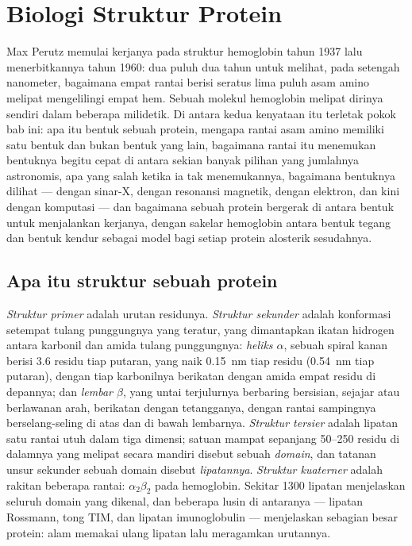 \chapter{Biologi Struktur Protein}\label{ch:b3:structural-biology}

Max Perutz memulai kerjanya pada struktur hemoglobin tahun 1937 lalu
menerbitkannya tahun 1960: dua puluh dua tahun untuk melihat, pada 
setengah nanometer, bagaimana empat rantai berisi seratus lima puluh asam
amino melipat mengelilingi empat hem. Sebuah molekul hemoglobin melipat
dirinya sendiri dalam beberapa milidetik. Di antara kedua kenyataan itu
terletak pokok bab ini: apa itu bentuk sebuah protein, mengapa rantai asam
amino memiliki satu bentuk dan bukan bentuk yang lain, bagaimana rantai itu
menemukan bentuknya begitu cepat di antara sekian banyak pilihan yang
jumlahnya astronomis, apa yang salah ketika ia tak menemukannya, bagaimana
bentuknya dilihat --- dengan sinar-X, dengan resonansi magnetik, dengan
elektron, dan kini dengan komputasi --- dan bagaimana sebuah protein bergerak di antara
bentuk untuk menjalankan kerjanya, dengan sakelar hemoglobin antara bentuk
tegang dan bentuk kendur sebagai model bagi setiap protein alosterik sesudahnya.

\section{Apa itu struktur sebuah protein}

\begin{definition}\label{def:b3:structural-biology:levels}
%
\emph{Struktur primer} adalah urutan residunya. \emph{Struktur sekunder}
adalah konformasi setempat tulang punggungnya yang teratur, yang dimantapkan
ikatan hidrogen antara karbonil dan amida tulang punggungnya: \emph{heliks
$\alpha$}, sebuah spiral kanan berisi $3.6$ residu tiap putaran, yang naik
\qty{0.15}{nm} tiap residu (\qty{0.54}{nm} tiap putaran), dengan tiap
karbonilnya berikatan dengan amida empat residu di depannya; dan
\emph{lembar $\beta$}, yang untai terjulurnya berbaring bersisian, sejajar
atau berlawanan arah, berikatan dengan tetangganya, dengan rantai sampingnya
berselang-seling di atas dan di bawah lembarnya. \emph{Struktur tersier}
adalah lipatan satu rantai utuh dalam tiga dimensi; satuan mampat sepanjang
\numrange{50}{250} residu di dalamnya yang melipat secara mandiri disebut
sebuah \emph{domain}, dan tatanan unsur sekunder sebuah domain disebut
\emph{lipatannya}. \emph{Struktur kuaterner} adalah rakitan beberapa rantai:
$\alpha_{2}\beta_{2}$ pada hemoglobin. Sekitar \num{1300} lipatan menjelaskan
seluruh domain yang dikenal, dan beberapa lusin di antaranya --- lipatan
Rossmann, tong TIM, dan lipatan imunoglobulin --- menjelaskan sebagian
besar protein: alam memakai ulang lipatan lalu meragamkan urutannya.
\end{definition}

